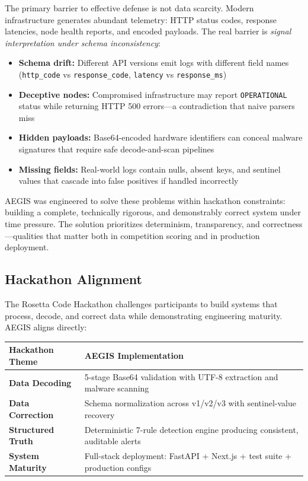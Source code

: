\documentclass[12pt,a4paper]{article}
\begin{document}
The primary barrier to effective defense is not data scarcity. Modern infrastructure generates abundant telemetry: HTTP status codes, response latencies, node health reports, and encoded payloads. The real barrier is \textit{signal interpretation under schema inconsistency}:

\begin{itemize}[noitemsep]
    \item \textbf{Schema drift:} Different API versions emit logs with different field names (\texttt{http\_code} vs \texttt{response\_code}, \texttt{latency} vs \texttt{response\_ms})
    \item \textbf{Deceptive nodes:} Compromised infrastructure may report \texttt{OPERATIONAL} status while returning HTTP 500 errors---a contradiction that naive parsers miss
    \item \textbf{Hidden payloads:} Base64-encoded hardware identifiers can conceal malware signatures that require safe decode-and-scan pipelines
    \item \textbf{Missing fields:} Real-world logs contain nulls, absent keys, and sentinel values that cascade into false positives if handled incorrectly
\end{itemize}

AEGIS was engineered to solve these problems within hackathon constraints: building a complete, technically rigorous, and demonstrably correct system under time pressure. The solution prioritizes determinism, transparency, and correctness---qualities that matter both in competition scoring and in production deployment.

\subsection{Hackathon Alignment}

The Rosetta Code Hackathon challenges participants to build systems that process, decode, and correct data while demonstrating engineering maturity. AEGIS aligns directly:

\begin{table}[H]
\centering
\begin{tabularx}{\linewidth}{>{\bfseries}l X}
\toprule
Hackathon Theme & AEGIS Implementation \\
\midrule
Data Decoding & 5-stage Base64 validation with UTF-8 extraction and malware scanning \\
Data Correction & Schema normalization across v1/v2/v3 with sentinel-value recovery \\
Structured Truth & Deterministic 7-rule detection engine producing consistent, auditable alerts \\
System Maturity & Full-stack deployment: FastAPI + Next.js + test suite + production configs \\
\bottomrule
\end{tabularx}
\end{table}
\end{document}
